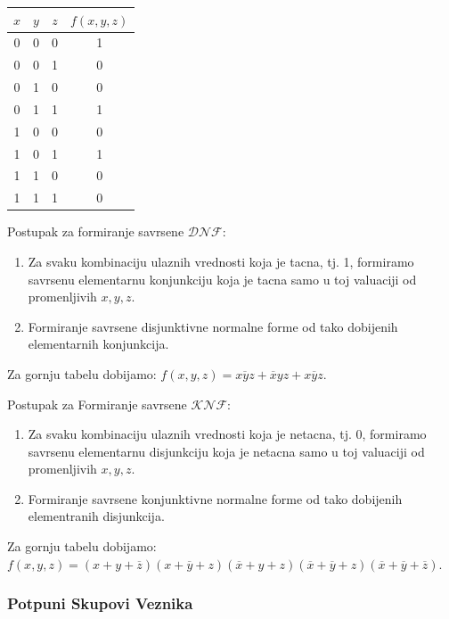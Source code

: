 \documentclass[12p,a4paper]{article}
\begin{document}
\begin{multicols}{2}
    \begin{tabular}{*{4}{c}}
        $x$ & $y$ & $z$ & $f(x, y, z)$ \\
        \midrule
        0 & 0 & 0 & 1 \\
        0 & 0 & 1 & 0 \\
        0 & 1 & 0 & 0 \\
        0 & 1 & 1 & 1 \\
        1 & 0 & 0 & 0 \\
        1 & 0 & 1 & 1 \\
        1 & 1 & 0 & 0 \\
        1 & 1 & 1 & 0 \\
    \end{tabular}

    Postupak za formiranje savrsene $\mathcal{DNF}$:
    \begin{enumerate}
        \itemsep0em
        \item Za svaku kombinaciju ulaznih vrednosti koja je tacna, tj. 1, 
              formiramo savrsenu elementarnu konjunkciju koja je tacna samo u 
              toj valuaciji od promenljivih $x, y, z$.
        \item Formiranje savrsene disjunktivne normalne forme od tako 
              dobijenih elementarnih konjunkcija.
    \end{enumerate}
    Za gornju tabelu dobijamo: 
    $f(x, y, z) = \overline{xyz} + \overline{x}yz + x\overline{y}z$.

    Postupak za Formiranje savrsene $\mathcal{KNF}$:
    \begin{enumerate}
        \itemsep0em
        \item Za svaku kombinaciju ulaznih vrednosti koja je netacna, tj. 0,
              formiramo savrsenu elementarnu disjunkciju koja je netacna samo 
              u toj valuaciji od promenljivih $x, y, z$.
        \item Formiranje savrsene konjunktivne normalne forme od tako 
              dobijenih elementranih disjunkcija.
    \end{enumerate}
    Za gornju tabelu dobijamo:
    $f(x, y, z) = (x + y + \overline{z}) 
                  (x + \overline{y} + z)
                  (\overline{x} + y + z)
                  (\overline{x} + \overline{y} + z)
                  (\overline{x} + \overline{y} + \overline{z})$.

    \subsubsection{Potpuni Skupovi Veznika}


\end{multicols}
\end{document}
